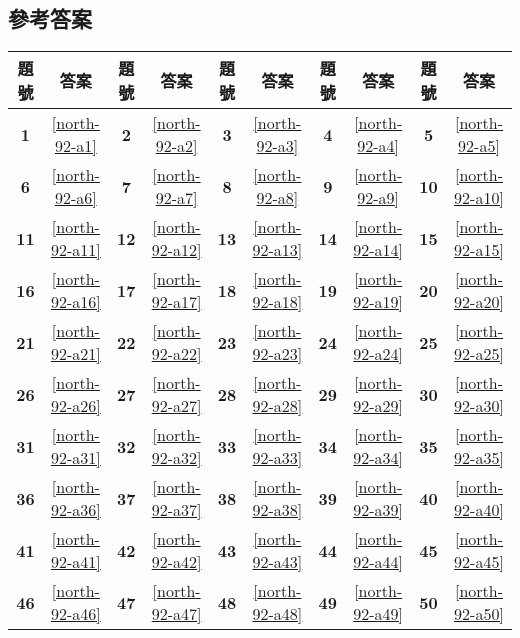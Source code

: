 \documentclass[12pt,a4paper]{report}
\begin{document}
\begin{CJK}{UTF8}{bkai}
\newpage

\section*{參考答案}

\begin{table}[h]
  \center
  \begin{tabular}{|c|c|c|c|c|c|c|c|c|c|}
  \hline
  題號 & 答案 & 題號 & 答案 & 題號 & 答案 & 題號 & 答案 & 題號 & 答案\\
  \hline\hline
  \textbf{1}  & \ref{north-92-a1} & \textbf{2}  & \ref{north-92-a2} & \textbf{3}  & \ref{north-92-a3} & \textbf{4}  & \ref{north-92-a4} & \textbf{5}  & \ref{north-92-a5}\\
  \hline
  \textbf{6}  & \ref{north-92-a6} & \textbf{7}  & \ref{north-92-a7} & \textbf{8}  & \ref{north-92-a8} & \textbf{9}  & \ref{north-92-a9} & \textbf{10} & \ref{north-92-a10}\\
  \hline
  \textbf{11} & \ref{north-92-a11} & \textbf{12} & \ref{north-92-a12} & \textbf{13} & \ref{north-92-a13} & \textbf{14} & \ref{north-92-a14} & \textbf{15} & \ref{north-92-a15}\\
  \hline
  \textbf{16} & \ref{north-92-a16} & \textbf{17} & \ref{north-92-a17} & \textbf{18} & \ref{north-92-a18} & \textbf{19} & \ref{north-92-a19} & \textbf{20} & \ref{north-92-a20}\\
  \hline
  \textbf{21} & \ref{north-92-a21} & \textbf{22} & \ref{north-92-a22} & \textbf{23} & \ref{north-92-a23} & \textbf{24} & \ref{north-92-a24} & \textbf{25} & \ref{north-92-a25}\\
  \hline
  \textbf{26} & \ref{north-92-a26} & \textbf{27} & \ref{north-92-a27} & \textbf{28} & \ref{north-92-a28} & \textbf{29} & \ref{north-92-a29} & \textbf{30} & \ref{north-92-a30}\\
  \hline
  \textbf{31} & \ref{north-92-a31} & \textbf{32} & \ref{north-92-a32} & \textbf{33} & \ref{north-92-a33} & \textbf{34} & \ref{north-92-a34} & \textbf{35} & \ref{north-92-a35}\\
  \hline
  \textbf{36} & \ref{north-92-a36} & \textbf{37} & \ref{north-92-a37} & \textbf{38} & \ref{north-92-a38} & \textbf{39} & \ref{north-92-a39} & \textbf{40} & \ref{north-92-a40}\\
  \hline
  \textbf{41} & \ref{north-92-a41} & \textbf{42} & \ref{north-92-a42} & \textbf{43} & \ref{north-92-a43} & \textbf{44} & \ref{north-92-a44} & \textbf{45} & \ref{north-92-a45}\\
  \hline
  \textbf{46} & \ref{north-92-a46} & \textbf{47} & \ref{north-92-a47} & \textbf{48} & \ref{north-92-a48} & \textbf{49} & \ref{north-92-a49} & \textbf{50} & \ref{north-92-a50}\\
  \hline
  \end{tabular}
\end{table}

\end{CJK}
\end{document}

